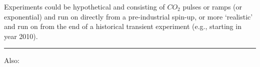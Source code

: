 \vspace{2mm}
\noindent Experiments could be hypothetical and consisting of \(CO_{2}\) pulses or ramps (or exponential) and run on directly from a pre-industrial spin-up, or more ‘realistic’ and run on from the end of a historical transient experiment (e.g., starting in year 2010).

\vspace{1mm} \noindent\rule{4cm}{0.1mm} \vspace{2mm}

\newpage

\noindent Also:

\begin{itemize}[noitemsep]


\end{itemize}
